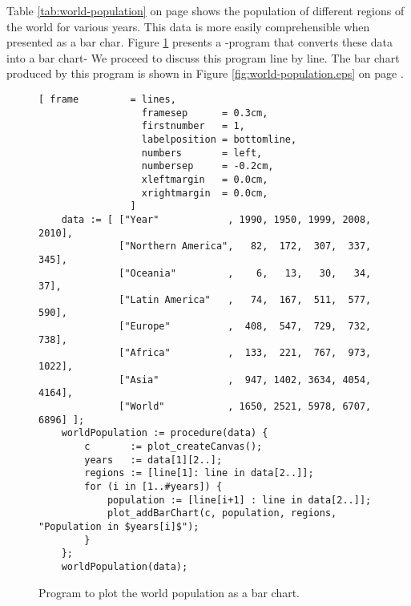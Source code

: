 \noindent
Table \ref{tab:world-population} on page \pageref{tab:world-population} shows the population of
different regions of the world for various years.  This data is more easily comprehensible when
presented as a bar char.  Figure \ref{fig:world-population.stlx} presents a \setlx-program that
converts these data into a bar chart-  We proceed to discuss this program line by line.
The bar chart produced by this program is shown in Figure \ref{fig:world-population.eps} on page
\pageref{fig:world-population.eps}.



\begin{figure}[!ht]
\centering
\begin{Verbatim}[ frame         = lines, 
                  framesep      = 0.3cm, 
                  firstnumber   = 1,
                  labelposition = bottomline,
                  numbers       = left,
                  numbersep     = -0.2cm,
                  xleftmargin   = 0.0cm,
                  xrightmargin  = 0.0cm,
                ]
    data := [ ["Year"            , 1990, 1950, 1999, 2008, 2010],
              ["Northern America",   82,  172,  307,  337,  345],
              ["Oceania"         ,    6,   13,   30,   34,   37],
              ["Latin America"   ,   74,  167,  511,  577,  590],
              ["Europe"          ,  408,  547,  729,  732,  738], 
              ["Africa"          ,  133,  221,  767,  973, 1022], 
              ["Asia"            ,  947, 1402, 3634, 4054, 4164],
              ["World"           , 1650, 2521, 5978, 6707, 6896] ];
    worldPopulation := procedure(data) {
        c       := plot_createCanvas();
        years   := data[1][2..];
        regions := [line[1]: line in data[2..]];
        for (i in [1..#years]) {
            population := [line[i+1] : line in data[2..]];
            plot_addBarChart(c, population, regions, "Population in $years[i]$");
        }
    };
    worldPopulation(data);
\end{Verbatim}
\vspace*{-0.3cm}
\caption{Program to plot the world population as a bar chart.}
\label{fig:world-population.stlx}
\end{figure}

